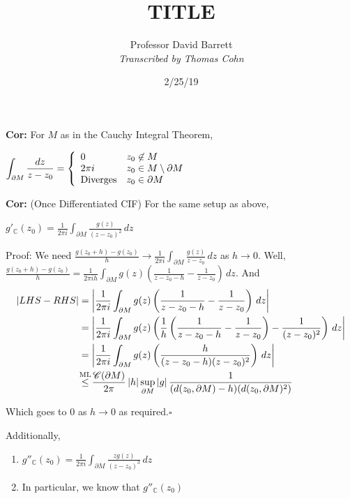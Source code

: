 \documentclass[10pt,letterpaper]{article}
\author{Professor David Barrett\\ \small\textit{Transcribed by Thomas Cohn}}
\title{TITLE}
\date{2/25/19} %
\newcommand{\n}{\hfill\break}
\newcommand{\cor}[1]{\par\noindent\settowidth{\hangindent}{\textbf{Cor: }}\textbf{Cor: }#1\n}
\newcommand{\proven}{\;$\square$\n}
\newcommand{\ptxt}[1]{\textrm{\textnormal{#1}}}
\newcommand{\inlineeq}[1]{\centerline{$\displaystyle #1$}}
\newcommand{\complex}{\mathbb{C}}
\newcommand{\C}{\complex}
\newcommand{\cut}{\setminus}
\newcommand{\abs}[1]{\left|#1\right|}
\newcommand{\paren}[1]{\left(#1\right)}
\begin{document}
\maketitle
\setlength\RaggedRightParindent{\parindent}
\RaggedRight

\cor{For $M$ as in the Cauchy Integral Theorem,\n
\inlineeq{
	\int_{\partial{}M}\frac{dz}{z-z_{0}}=\left\{\begin{array}{ll}
	0 & z_{0}\not\in{}M\\
	2\pi{}i & z_{0}\in{}M\cut\partial{}M\\
	\ptxt{Diverges} & z_{0}\in\partial{}M
	\end{array}\right.
}}

\cor{(Once Differentiated CIF)\n
For the same setup as above,\n\inlineeq{
	g'_{\C}(z_{0})=\frac{1}{2\pi{}i}\int_{\partial{}M}\frac{g(z)}{(z-z_{0})^{2}}\,dz
}}

\par\noindent Proof: We need $\displaystyle\frac{g(z_{0}+h)-g(z_{0})}{h}\to\frac{1}{2\pi{}i}\int_{\partial{}M}\frac{g(z)}{z-z_{0}}\,dz$ as $h\to{}0$.\n
Well, $\displaystyle\frac{g(z_{0}+h)-g(z_{0})}{h}=\frac{1}{2\pi{}ih}\int_{\partial{}M}g(z)\paren{\frac{1}{z-z_{0}-h}-\frac{1}{z-z_{0}}}\,dz$. And
\begin{align*}
	\abs{LHS-RHS} & =\abs{\frac{1}{2\pi{}i}\int_{\partial{}M}g(z)\paren{\frac{1}{z-z_{0}-h}-\frac{1}{z-z_{0}}}\,dz}\\
	& =\abs{\frac{1}{2\pi{}i}\int_{\partial{}M}g(z)\paren{\frac{1}{h}\paren{\frac{1}{z-z_{0}-h}-\frac{1}{z-z_{0}}}-\frac{1}{(z-z_{0})^{2}}}\,dz}\\
	& =\abs{\frac{1}{2\pi{}i}\int_{\partial{}M}g(z)\paren{\frac{h}{(z-z_{0}-h)(z-z_{0})^{2}}}\,dz}\\
	& \overset{\mathclap{\ptxt{ML}}}{\le}\frac{\mathscr{C}(\partial{}M)}{2\pi}\abs{h}\underset{\partial{}M}{\sup}\abs{g}\frac{1}{(d(z_{0},\partial{}M)-h)(d(z_{0},\partial{}M)^{2})}
\end{align*}

\par\noindent Which goes to $0$ as $h\to{}0$ as required.\proven

\par\noindent Additionally,
\begin{enumerate}[label=\arabic*), topsep=0pt]
	\item $\displaystyle{}g''_{\C}(z_{0})=\frac{1}{2\pi{}i}\int_{\partial{}M}\frac{zg(z)}{(z-z_{0})^{3}}\,dz$
	\item In particular, we know that $g''_{\C}(z_{0})$
\end{enumerate}
\end{document}
